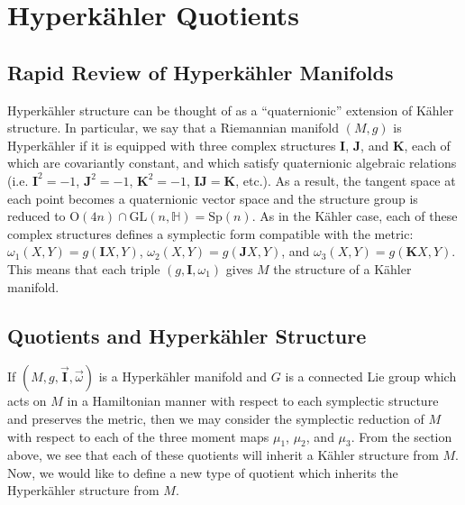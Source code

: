 \section{Hyperk\"ahler Quotients}
\subsection{Rapid Review of Hyperk\"ahler Manifolds}
Hyperk\"ahler structure can be thought of as a ``quaternionic'' extension of K\"ahler structure. In particular, we say that a Riemannian manifold $(M,g)$ is Hyperk\"ahler if it is equipped with three complex structures $\mathbf{I}$, $\mathbf{J}$, and $\mathbf{K}$, each of which are covariantly constant, and which satisfy quaternionic algebraic relations (i.e. $\mathbf{I}^2 = -1$, $\mathbf{J}^2 = -1$, $\mathbf{K}^2 = -1$, $\mathbf{I}\mathbf{J} = \mathbf{K}$, etc.). As a result, the tangent space at each point becomes a quaternionic vector space and the structure group is reduced to $\mathrm{O}(4n)\cap \mathrm{GL}(n,\mathbb{H}) = \mathrm{Sp}(n)$. As in the K\"ahler case, each of these complex structures defines a symplectic form compatible with the metric: $\omega_1(X,Y) = g(\mathbf{I}X,Y)$, $\omega_2(X,Y) = g(\mathbf{J}X,Y)$, and $\omega_3(X,Y) = g(\mathbf{K}X,Y)$. This means that each triple $(g, \mathbf{I}, \omega_1)$ gives $M$ the structure of a K\"ahler manifold. 
\subsection{Quotients and Hyperk\"ahler Structure}
If $(M,g,\vec{\mathbf{I}},\vec{\omega})$ is a Hyperk\"ahler manifold and $G$ is a connected Lie group which acts on $M$ in a Hamiltonian manner with respect to each symplectic structure and preserves the metric, then we may consider the symplectic reduction of $M$ with respect to each of the three moment maps $\mu_1$, $\mu_2$, and $\mu_3$. From the section above, we see that each of these quotients will inherit a K\"ahler structure from $M$. Now, we would like to define a new type of quotient which inherits the Hyperk\"ahler structure from $M$. 

